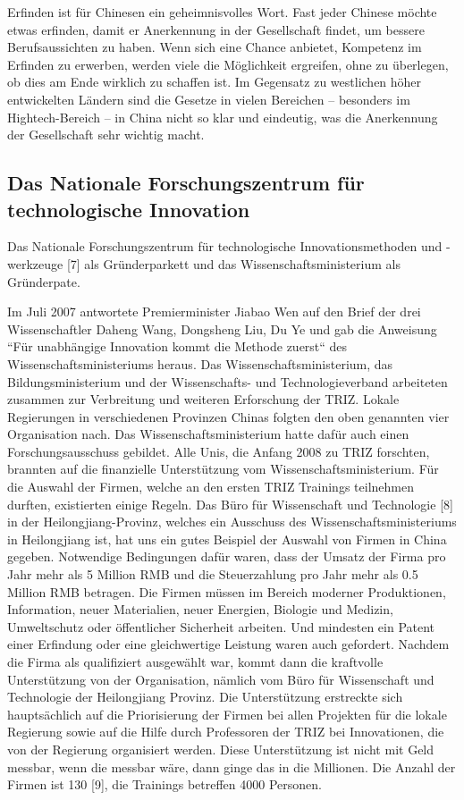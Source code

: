 \documentclass[11pt,a4paper]{article}
\begin{document}
Erfinden ist für Chinesen ein geheimnisvolles Wort. Fast jeder Chinese möchte
etwas erfinden, damit er Anerkennung in der Gesellschaft findet, um bessere
Berufsaussichten zu haben. Wenn sich eine Chance anbietet, Kompetenz im
Erfinden zu erwerben, werden viele die Möglichkeit ergreifen, ohne zu
überlegen, ob dies am Ende wirklich zu schaffen ist. Im Gegensatz zu
westlichen höher entwickelten Ländern sind die Gesetze in vielen Bereichen --
besonders im Hightech-Bereich -- in China nicht so klar und eindeutig, was die
Anerkennung der Gesellschaft sehr wichtig macht.

\subsection{Das Nationale Forschungszentrum für technologische Innovation}

Das Nationale Forschungszentrum für technologische Innovationsmethoden und
-werkzeuge [7] als Gründerparkett und das Wissenschaftsministerium als
Gründerpate.

Im Juli 2007 antwortete Premierminister Jiabao Wen auf den Brief der drei
Wissenschaftler Daheng Wang, Dongsheng Liu, Du Ye und gab die Anweisung “Für
unabhängige Innovation kommt die Methode zuerst“ des Wissenschaftsministeriums
heraus. Das Wissenschaftsministerium, das Bildungsministerium und der
Wissenschafts- und Technologieverband arbeiteten zusammen zur Verbreitung und
weiteren Erforschung der TRIZ. Lokale Regierungen in verschiedenen Provinzen
Chinas folgten den oben genannten vier Organisation nach.  Das
Wissenschaftsministerium hatte dafür auch einen Forschungsausschuss
gebildet. Alle Unis, die Anfang 2008 zu TRIZ forschten, brannten auf die
finanzielle Unterstützung vom Wissenschaftsministerium. Für die Auswahl der
Firmen, welche an den ersten TRIZ Trainings teilnehmen durften, existierten
einige Regeln. Das Büro für Wissenschaft und Technologie [8] in der
Heilongjiang-Provinz, welches ein Ausschuss des Wissenschaftsministeriums in
Heilongjiang ist, hat uns ein gutes Beispiel der Auswahl von Firmen in China
gegeben. Notwendige Bedingungen dafür waren, dass der Umsatz der Firma pro
Jahr mehr als 5 Million RMB und die Steuerzahlung pro Jahr mehr als 0.5
Million RMB betragen. Die Firmen müssen im Bereich moderner Produktionen,
Information, neuer Materialien, neuer Energien, Biologie und Medizin,
Umweltschutz oder öffentlicher Sicherheit arbeiten. Und mindesten ein Patent
einer Erfindung oder eine gleichwertige Leistung waren auch gefordert. Nachdem
die Firma als qualifiziert ausgewählt war, kommt dann die kraftvolle
Unterstützung von der Organisation, nämlich vom Büro für Wissenschaft und
Technologie der Heilongjiang Provinz. Die Unterstützung erstreckte sich
hauptsächlich auf die Priorisierung der Firmen bei allen Projekten für die
lokale Regierung sowie auf die Hilfe durch Professoren der TRIZ bei
Innovationen, die von der Regierung organisiert werden. Diese Unterstützung
ist nicht mit Geld messbar, wenn die messbar wäre, dann ginge das in die
Millionen. Die Anzahl der Firmen ist 130 [9], die Trainings betreffen 4000
Personen.
\end{document}
